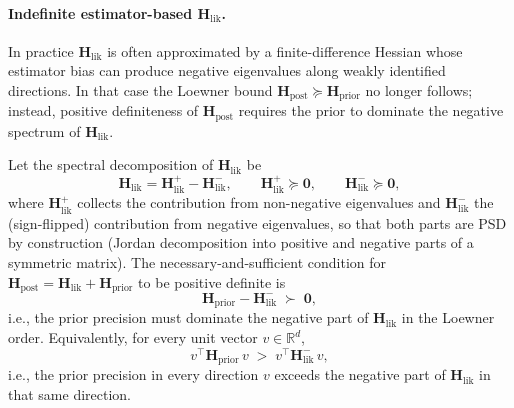 \documentclass[11pt]{article}
\begin{document}
\paragraph{Indefinite estimator-based $\mathbf H_{\mathrm{lik}}$.}
In practice $\mathbf H_{\mathrm{lik}}$ is often approximated by a finite-difference Hessian whose estimator bias can produce negative eigenvalues along weakly identified directions. In that case the Loewner bound $\mathbf H_{\mathrm{post}} \succeq \mathbf H_{\mathrm{prior}}$ no longer follows; instead, positive definiteness of $\mathbf H_{\mathrm{post}}$ requires the prior to dominate the negative spectrum of $\mathbf H_{\mathrm{lik}}$.

Let the spectral decomposition of $\mathbf H_{\mathrm{lik}}$ be
\begin{equation}
\mathbf H_{\mathrm{lik}} = \mathbf H_{\mathrm{lik}}^+ - \mathbf H_{\mathrm{lik}}^-,
\qquad
\mathbf H_{\mathrm{lik}}^+ \succeq \mathbf 0,
\qquad
\mathbf H_{\mathrm{lik}}^- \succeq \mathbf 0,
\label{eq:hlik-jordan-decomposition}
\end{equation}
where $\mathbf H_{\mathrm{lik}}^+$ collects the contribution from non-negative eigenvalues and $\mathbf H_{\mathrm{lik}}^-$ the (sign-flipped) contribution from negative eigenvalues, so that both parts are PSD by construction (Jordan decomposition into positive and negative parts of a symmetric matrix). The necessary-and-sufficient condition for $\mathbf H_{\mathrm{post}} = \mathbf H_{\mathrm{lik}} + \mathbf H_{\mathrm{prior}}$ to be positive definite is
\begin{equation}
\mathbf H_{\mathrm{prior}} - \mathbf H_{\mathrm{lik}}^- \;\succ\; \mathbf 0,
\label{eq:dominance-condition}
\end{equation}
i.e., the prior precision must dominate the negative part of $\mathbf H_{\mathrm{lik}}$ in the Loewner order. Equivalently, for every unit vector $v \in \mathbb{R}^d$,
\begin{equation}
v^\top \mathbf H_{\mathrm{prior}}\, v \;>\; v^\top \mathbf H_{\mathrm{lik}}^-\, v,
\label{eq:dominance-condition-vector}
\end{equation}
i.e., the prior precision in every direction $v$ exceeds the negative part of $\mathbf H_{\mathrm{lik}}$ in that same direction.
\end{document}
